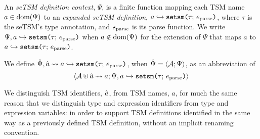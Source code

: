 \begin{enumerate}
An \emph{seTSM definition context}, $\Psi$, is a finite function mapping each TSM name $a \in \text{dom}(\Psi)$ to an \emph{expanded seTSM definition}, $a \hookrightarrow \texttt{setsm}\texttt{(}\tau;\,e_\text{parse}\texttt{)}$, where $\tau$ is the seTSM's type annotation, and $e_\text{parse}$ is its parse function. We write $\Psi, a \hookrightarrow \texttt{setsm}\texttt{(}\tau;\,e_\text{parse}\texttt{)}$ when $a \notin \text{dom}(\Psi)$ for the extension of $\Psi$ that maps $a$ to $a \hookrightarrow \texttt{setsm}\texttt{(}\tau;\,e_\text{parse}\texttt{)}$. %

We define $\hat{\Psi}, \hat{a} \leadsto a \hookrightarrow \texttt{setsm}\texttt{(}\tau;\,e_\text{parse}\texttt{)}$, when $\hat{\Psi}=\langle \mathcal{A}; \Psi \rangle$, as an abbreviation of \[\langle \mathcal{A} \uplus \hat{a} \leadsto a; \Psi, a \hookrightarrow \texttt{setsm}\texttt{(}\tau;\,e_\text{parse}\texttt{)} \rangle\]

We distinguish TSM identifiers, $\hat{a}$, from TSM names, $a$, for much the same reason that we distinguish type and expression identifiers from type and expression variables: in order to support TSM definitions identified in the same way as a previously defined TSM definition, without an implicit renaming convention. %

\end{enumerate}



